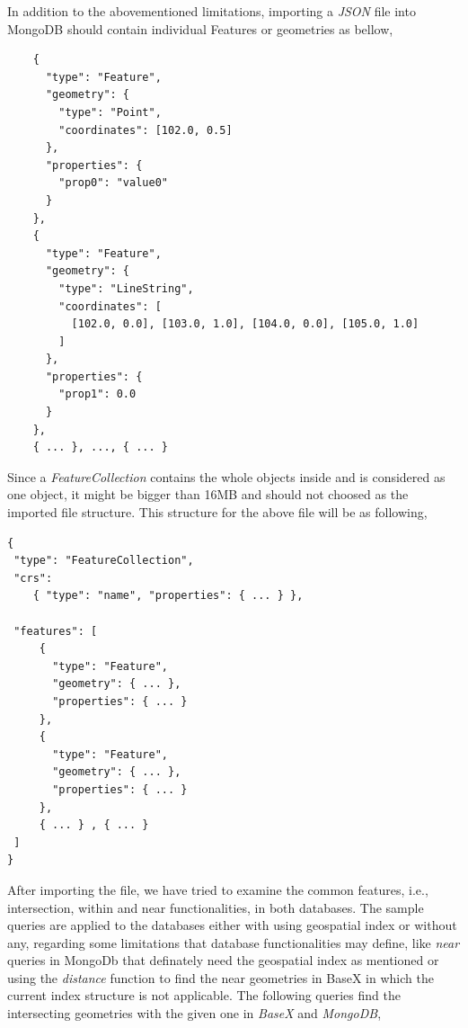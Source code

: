\documentclass[a4paper,12pt]{article}
\begin{document}
In addition to the abovementioned limitations, importing a \textit{JSON} file into MongoDB should contain individual Features or geometries as bellow, 
 
\begin{verbatim}
    {
      "type": "Feature",
      "geometry": {
        "type": "Point",
        "coordinates": [102.0, 0.5]
      },
      "properties": {
        "prop0": "value0"
      }
    },
    {
      "type": "Feature",
      "geometry": {
        "type": "LineString",
        "coordinates": [
          [102.0, 0.0], [103.0, 1.0], [104.0, 0.0], [105.0, 1.0]
        ]
      },
      "properties": {
        "prop1": 0.0
      }
    }, 
    { ... }, ..., { ... }
\end{verbatim}

Since a \textit{FeatureCollection} contains the whole objects inside and is considered as one object, it might be bigger than 16MB and should not choosed as the imported file structure. This structure for the above file will be as following,
\begin{verbatim}
{
 "type": "FeatureCollection",
 "crs": 
    { "type": "name", "properties": { ... } },
                                                                                
 "features": [
     {
       "type": "Feature",
       "geometry": { ... },
       "properties": { ... }
     },
     {
       "type": "Feature",
       "geometry": { ... },
       "properties": { ... }
     }, 
     { ... } , { ... }
 ]
}
\end{verbatim}

After importing the file, we have tried to examine the common features, i.e., intersection, within and near functionalities, in both databases.
The sample queries are applied to the databases either with using geospatial index or without any, regarding some limitations that database functionalities may define, like \textit{near} queries in MongoDb that definately need the geospatial index as mentioned or using the \textit{distance} function to find the near geometries in BaseX in which the current index structure is not applicable.
The following queries find the intersecting geometries with the given one in \textit{BaseX} and \textit{MongoDB},
\end{document}
